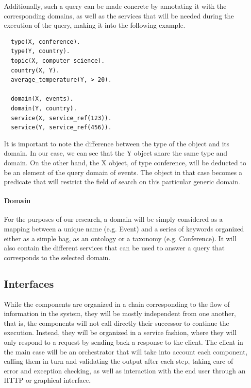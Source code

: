 Additionally, such a query can be made concrete by annotating it with the corresponding domains, as well as the services that will be needed during the execution of the query, making it into the following example.

\begin{verbatim}
  type(X, conference).
  type(Y, country).
  topic(X, computer science).
  country(X, Y).
  average_temperature(Y, > 20).
  
  domain(X, events).
  domain(Y, country).
  service(X, service_ref(123)).
  service(Y, service_ref(456)).
\end{verbatim}

It is important to note the difference between the type of the object and its domain. In our case, we can see that the Y object share the same type and domain. On the other hand, the X object, of type conference, will be deducted to be an element of the query domain of events. The object in that case becomes a predicate that will restrict the field of search on this particular generic domain.


\paragraph{Domain} %
\label{sub:domain}

For the purposes of our research, a domain will be simply considered as a mapping between a unique name (e.g. Event) and a series of keywords organized either as a simple bag, as an ontology or a taxonomy (e.g. Conference). It will also contain the different services that can be used to answer a query that corresponds to the selected domain.


\subsection{Interfaces} %
\label{sub:interfaces}

While the components are organized in a chain corresponding to the flow of information in the system, they will be mostly independent from one another, that is, the components will not call directly their successor to continue the execution. Instead, they will be organized in a service fashion, where they will only respond to a request by sending back a response to the client. The client in the main case will be an orchestrator that will take into account each component, calling them in turn and validating the output after each step, taking care of error and exception checking, as well as interaction with the end user through an HTTP or graphical interface.

